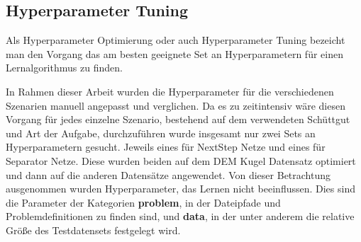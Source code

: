\subsection{Hyperparameter Tuning}








Als Hyperparameter Optimierung oder auch Hyperparameter Tuning bezeicht man den Vorgang das am besten geeignete Set an 
Hyperparametern für einen Lernalgorithmus zu finden.

In Rahmen dieser Arbeit wurden die Hyperparameter für die verschiedenen Szenarien manuell angepasst und verglichen.
Da es zu zeitintensiv wäre diesen Vorgang für jedes einzelne Szenario, bestehend auf dem verwendeten Schüttgut und Art der Aufgabe, durchzuführen
wurde insgesamt nur zwei Sets an Hyperparametern gesucht.
Jeweils eines für NextStep Netze und eines für Separator Netze.
Diese wurden beiden auf dem DEM Kugel Datensatz optimiert und dann auf die anderen Datensätze angewendet.
Von dieser Betrachtung ausgenommen wurden Hyperparameter, das Lernen nicht beeinflussen.
Dies sind die Parameter der Kategorien {\sffamily \textbf{problem}}, in der Dateipfade und Problemdefinitionen zu finden sind, 
und {\sffamily \textbf{data}}, in der unter anderem die relative Größe des Testdatensets festgelegt wird.


